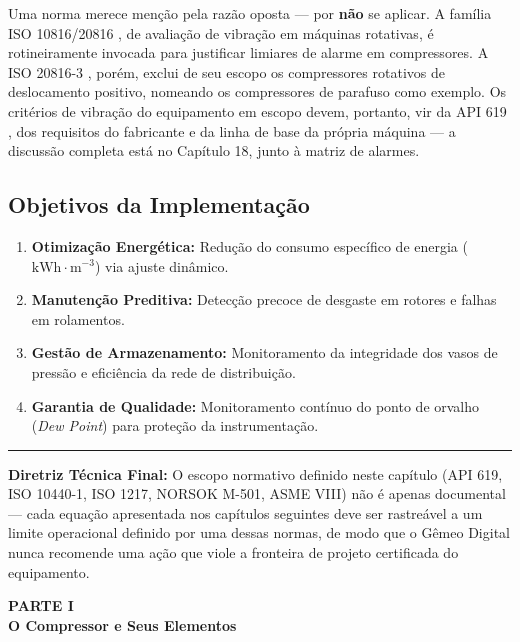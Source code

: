 \documentclass[12pt,a4paper]{article}
\numberwithin{equation}{section}
\numberwithin{table}{section}
\numberwithin{figure}{section}
\begin{document}
	Uma norma merece menção pela razão oposta — por \textbf{não} se aplicar. A família ISO 10816/20816 \cite{iso10816, iso20816}, de avaliação de vibração em máquinas rotativas, é rotineiramente invocada para justificar limiares de alarme em compressores. A ISO 20816-3 \cite{iso20816}, porém, exclui de seu escopo os compressores rotativos de deslocamento positivo, nomeando os compressores de parafuso como exemplo. Os critérios de vibração do equipamento em escopo devem, portanto, vir da API 619 \cite{api619}, dos requisitos do fabricante e da linha de base da própria máquina — a discussão completa está no Capítulo 18, junto à matriz de alarmes.
	
	\subsection{\textbf{Objetivos da Implementação}}
	\begin{enumerate}
		\item \textbf{Otimização Energética:} Redução do consumo específico de energia ($\text{kWh} \cdot \text{m}^{-3}$) via ajuste dinâmico.
		\item \textbf{Manutenção Preditiva:} Detecção precoce de desgaste em rotores e falhas em rolamentos.
		\item \textbf{Gestão de Armazenamento:} Monitoramento da integridade dos vasos de pressão e eficiência da rede de distribuição.
		\item \textbf{Garantia de Qualidade:} Monitoramento contínuo do ponto de orvalho (\textit{Dew Point}) para proteção da instrumentação.
	\end{enumerate}

	\vspace{1em}
	\hrule
	\vspace{1em}

	\textbf{Diretriz Técnica Final:} O escopo normativo definido neste capítulo (API 619, ISO 10440-1, ISO 1217, NORSOK M-501, ASME VIII) não é apenas documental — cada equação apresentada nos capítulos seguintes deve ser rastreável a um limite operacional definido por uma dessas normas, de modo que o Gêmeo Digital nunca recomende uma ação que viole a fronteira de projeto certificada do equipamento.

	\clearpage
	\thispagestyle{empty}
	\vspace*{\fill}
	\begin{center}
		{\Huge\bfseries PARTE I}\\[2em]
		{\huge\bfseries O Compressor e Seus Elementos}
	\end{center}
	\vspace*{\fill}
	\clearpage
\end{document}
